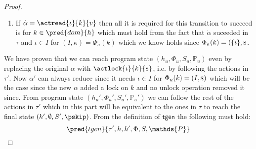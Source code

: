 \begin{lem}
\begin{proof}
\begin{enumerate}
		\item If $\dot{\alpha} = \actread{\iota}{k}{v}$ then all it is required for this transition to succeed is for $k \in \pred{dom}{h}$ which must hold from the fact that $\dot{\alpha}$ suceeded in $\tau$ and $\iota \in I$ for $(I, \kappa) = \Phi_a(k)$ which we know holds since $\Phi_a(k) = (\{\iota\}, \textsc{s}$.
	\end{enumerate}
	We have proven that we can reach program state $(h_u, \Phi_u, S_u, \mathds{P}_u)$ even by replacing the original $\alpha$ with $\actlock{\iota}{k}{\textsc{s}}$, i.e. by following the actions in $\tau'$. Now $\alpha'$ can always reduce since it needs $\iota \in I$ for $\Phi_u(k) = (I, \textsc{s})$ which will be the case since the new $\alpha$ added a lock on $k$ and no unlock operation removed it since. From program state $(h_u', \Phi_u', S_u', \mathds{P}_u')$ we can follow the rest of the actions in $\tau'$ which in this part will be equivalent to the ones in $\tau$ to reach the final state $(h', \emptyset, S', \pskip)$. From the definition of $\mathsf{tgen}$ the following must hold:
	\[
		\pred{tgen}{\tau', h, h', \Phi, S, \mathds{P}}
	\]
	\end{proof}
\end{lem}

